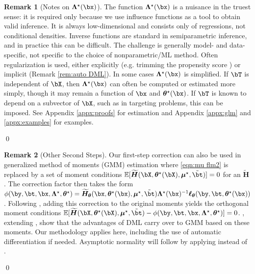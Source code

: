 \documentclass[12pt]{article}
\numberwithin{equation}{section}
\theoremstyle{definition}
\newtheorem{remarkTmp}{Remark}
\newenvironment{remark}
	{\medskip  \begin{remarkTmp} 	}
	{ 
		\renewcommand{\qedsymbol}{$\clubsuit$}
		\qed 
		\end{remarkTmp} 
	}
\newcommand{\E}{\mathbb{E}}
\newcommand{\bmu}{\boldsymbol{\mu}}
\newcommand{\btheta}{\boldsymbol{\theta}}
\newcommand{\bL}{\boldsymbol{\Lambda}}
\newcommand{\bmtrue}{\bmu^\star}
\newcommand{\bttrue}{\btheta^\star}
\newcommand{\bLtrue}{\bL^\star}
\newcommand{\btstar}{\tilde{\bt}}
\begin{document}
\begin{remark}[Notes on $\bLtrue(\bx)$]
    \label{rem:lambda}
    The function $\bLtrue(\bx)$ is a nuisance in the truest sense: it is required only because we use influence functions as a tool to obtain valid inference. It is always low-dimensional and consists only of regressions, not conditional densities. Inverse functions are standard in semiparametric inference, and in practice this can be difficult. The challenge is generally model- and data-specific, not specific to the choice of nonparametric/ML method. Often regularization is used, either explicitly (e.g. trimming the propensity score \cite{Ma-Wang2020_JASA}) or implicit (Remark \ref{rem:auto DML}). In some cases $\bLtrue(\bx)$ is simplified. If $\bT$ is independent of $\bX$, then $\bLtrue(\bx)$ can often be computed or estimated more simply, though it may remain a function of $\bx$ and $\bttrue(\bx)$. If $\bT$ is known to depend on a subvector of $\bX$, such as in targeting problems, this can be imposed. See Appendix \ref{appx:proofs} for estimation and Appendix \ref{appx:glm} and \ref{appx:examples} for examples.
\end{remark}



\begin{remark}[Other Second Steps]
    \label{rem:gmm}
    Our first-step correction can also be used in generalized method of moments (GMM) estimation where \eqref{eqn:mu flm2} is replaced by a set of moment conditions $\E[\bm{\widetilde{H}}(\bX, \bttrue(\bX), \bmtrue, \btstar)] = 0$ for an $\bm{\widetilde{H}}$. The correction factor then takes the form $\phi(\by,\bt,\bx, \bLtrue, \bttrue) = \bm{\widetilde{H}}_{\btheta}(\bx, \bttrue(\bx ),\bmtrue, \btstar) \bLtrue(\bx)^{-1} \bm{\ell}_{\btheta}(\by,\bt, \bttrue(\bx))$. Following \cite{Chernozhukov-etal2022_Ecma}, adding this correction to the original moments yields the orthogonal moment conditions $\E[\bm{\widetilde{H}}(\bX, \bttrue(\bX), \bmtrue, \btstar) - \phi(\by,\bt,\bx, \bLtrue, \bttrue)] = 0$. \cite{Chernozhukov-etal2022_Ecma}, extending \cite{Chernozhukov-etal2018_EJ}, show that the advantages of DML carry over to GMM based on these moments. Our methodology applies here, including the use of automatic differentiation if needed. Asymptotic normality will follow by applying \cite{Chernozhukov-etal2022_Ecma} instead of \cite{Chernozhukov-etal2018_EJ}.
\end{remark}
\end{document}

